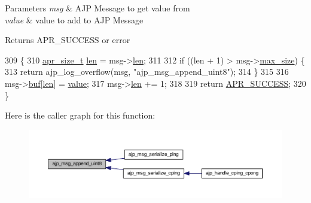 \begin{DoxyParams}{Parameters}
{\em msg} & A\+JP Message to get value from \\
\hline
{\em value} & value to add to A\+JP Message \\
\hline
\end{DoxyParams}
\begin{DoxyReturn}{Returns}
A\+P\+R\+\_\+\+S\+U\+C\+C\+E\+SS or error 
\end{DoxyReturn}

\begin{DoxyCode}
309 \{
310     \hyperlink{group__apr__platform_gaaa72b2253f6f3032cefea5712a27540e}{apr\_size\_t} \hyperlink{group__APACHE__CORE__LOG_gab5a43233d60ef05c5b5bf5cba3d74468}{len} = msg->\hyperlink{structajp__msg_ab31fbddb808b5f3c0549cdb0f39639cf}{len};
311 
312     \textcolor{keywordflow}{if} ((len + 1) > msg->\hyperlink{structajp__msg_a70f7c841e5b344fc94175a0ebcd7f062}{max\_size}) \{
313         \textcolor{keywordflow}{return} ajp\_log\_overflow(msg, \textcolor{stringliteral}{"ajp\_msg\_append\_uint8"});
314     \}
315 
316     msg->\hyperlink{structajp__msg_a7343b1803e9177dccb3c4716a5e12c3a}{buf}[\hyperlink{group__APACHE__CORE__LOG_gab5a43233d60ef05c5b5bf5cba3d74468}{len}] = \hyperlink{group__apr__env_ga711ebc0efad43aba10f32ded4a28cf17}{value};
317     msg->\hyperlink{structajp__msg_ab31fbddb808b5f3c0549cdb0f39639cf}{len} += 1;
318 
319     \textcolor{keywordflow}{return} \hyperlink{group__apr__errno_ga9ee311b7bf1c691dc521d721339ee2a6}{APR\_SUCCESS};
320 \}
\end{DoxyCode}


Here is the caller graph for this function\+:
\nopagebreak
\begin{figure}[H]
\begin{center}
\leavevmode
\includegraphics[width=350pt]{group__AJP__api_ga3afb22b56fa344c93861e6090b044568_icgraph}
\end{center}
\end{figure}


